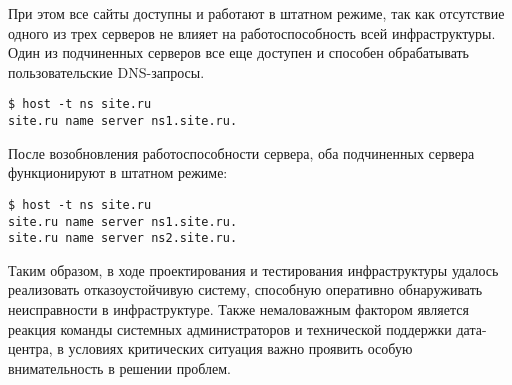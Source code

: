 При этом все сайты доступны и работают в штатном режиме, так как отсутствие одного из трех серверов не влияет на работоспособность всей инфраструктуры.
Один из подчиненных серверов все еще доступен и способен обрабатывать пользовательские DNS-запросы.
\begin{lstlisting}
$ host -t ns site.ru
site.ru name server ns1.site.ru.
\end{lstlisting}

После возобновления работоспособности сервера, оба подчиненных сервера функционируют в штатном режиме:
\begin{lstlisting}
$ host -t ns site.ru
site.ru name server ns1.site.ru.
site.ru name server ns2.site.ru.
\end{lstlisting}

Таким образом, в ходе проектирования и тестирования инфраструктуры удалось реализовать отказоустойчивую систему, способную оперативно обнаруживать неисправности в инфраструктуре.
Также немаловажным фактором является реакция команды системных администраторов и технической поддержки дата-центра, в условиях критических ситуация важно проявить особую внимательность в решении проблем.

\clearpage
